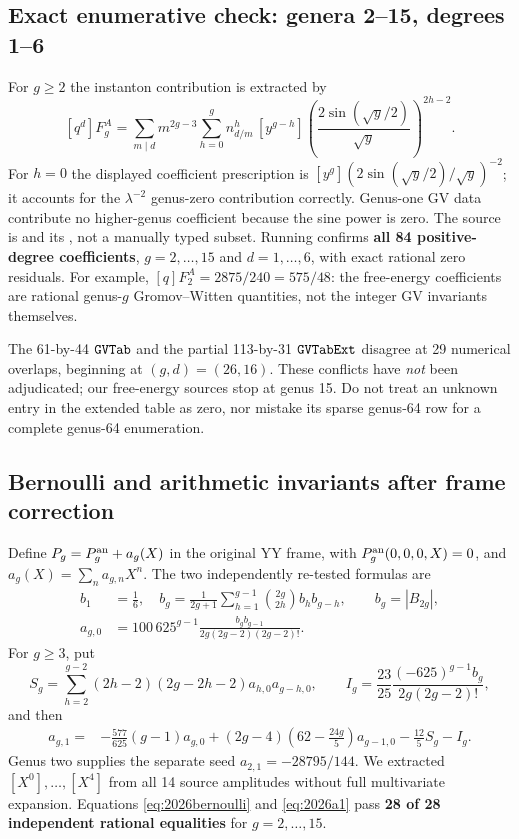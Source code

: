\subsection{Exact enumerative check: genera 2--15, degrees 1--6}
For $g\ge2$ the instanton contribution is extracted by
\begin{equation}\label{eq:2026gv}
 [q^d] F_g^A
 =\sum_{m\mid d}m^{2g-3}
  \sum_{h=0}^{g} n^h_{d/m}\,
  [y^{g-h}]\left(\frac{2\sin(\sqrt y/2)}{\sqrt y}\right)^{2h-2}.
\end{equation}
For $h=0$ the displayed coefficient prescription is
$[y^g](2\sin(\sqrt y/2)/\sqrt y)^{-2}$; it accounts for the
$\lambda^{-2}$ genus-zero contribution correctly. Genus-one GV data
contribute no higher-genus coefficient because the sine power is zero.
The source is  and its , not a manually typed
subset. Running  confirms \textbf{all 84
positive-degree coefficients}, $g=2,\dots,15$ and $d=1,\dots,6$, with
exact rational zero residuals. For example, $[q]F_2^A=2875/240=575/48$:
the free-energy coefficients are rational genus-$g$ Gromov--Witten
quantities, not the integer GV invariants themselves.

The 61-by-44 $\code{GVTab}$ and the partial 113-by-31
$\code{GVTabExt}$ disagree at 29 numerical overlaps, beginning at
$(g,d)=(26,16)$. These conflicts have \emph{not} been adjudicated;
our free-energy sources stop at genus 15. Do not treat an unknown entry
in the extended table as zero, nor mistake its sparse genus-64 row for a
complete genus-64 enumeration.

\subsection{Bernoulli and arithmetic invariants after frame correction}
Define $P_g=P_g^{\rm an}+a_g(X)$ in the original YY frame,
with $P_g^{\rm an}(0,0,0,X)=0$, and $a_g(X)=\sum_n a_{g,n}X^n$.
The two independently re-tested formulas are
\begin{align}\label{eq:2026bernoulli}
 b_1&=\frac16,\quad
 b_g=\frac{1}{2g+1}\sum_{h=1}^{g-1}{2g\choose 2h}b_hb_{g-h},
 \qquad b_g=|B_{2g}|,\\
 a_{g,0}&=100\,625^{g-1}\frac{b_gb_{g-1}}{2g(2g-2)(2g-2)!}.
\end{align}
For $g\ge3$, put
\begin{equation}
 S_g=\sum_{h=2}^{g-2}(2h-2)(2g-2h-2)a_{h,0}a_{g-h,0},\qquad
 I_g=\frac{23}{25}\frac{(-625)^{g-1}b_g}{2g(2g-2)!},
\end{equation}
and then
\begin{align}\label{eq:2026a1}
 a_{g,1}={}&-\frac{577}{625}(g-1)a_{g,0}
 +(2g-4)\left(62-\frac{24g}{5}\right)a_{g-1,0}
 -\frac{12}{5}S_g-I_g.
\end{align}
Genus two supplies the separate seed $a_{2,1}=-28795/144$.
We extracted $[X^0],\ldots,[X^4]$ from all 14 source amplitudes
without full multivariate expansion. Equations \eqref{eq:2026bernoulli} and
\eqref{eq:2026a1} pass \textbf{28 of 28 independent rational equalities}
for $g=2,\ldots,15$.

